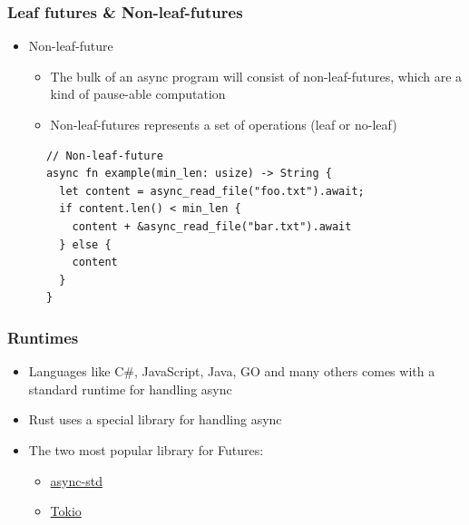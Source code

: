\begin{frame}[fragile]
    \frametitle{Leaf futures \& Non-leaf-futures}
    \begin{itemize}

        \item Non-leaf-future
        \begin{itemize}
            \item The bulk of an async program will consist of non-leaf-futures, which are a kind of pause-able computation
            \item Non-leaf-futures represents a set of operations (leaf or no-leaf)
        \end{itemize}
    \end{itemize}
    \begin{block}{}
        \begin{verbatim}
      // Non-leaf-future
      async fn example(min_len: usize) -> String {
        let content = async_read_file("foo.txt").await;
        if content.len() < min_len {
          content + &async_read_file("bar.txt").await
        } else {
          content
        }
      }
        \end{verbatim}
    \end{block}
\end{frame}
\begin{frame}[fragile]
    \frametitle{Runtimes}
    \begin{itemize}
        \item Languages like C\#, JavaScript, Java, GO and many others comes with a standard runtime for handling async
        \item Rust uses a special library for handling async

        \item The two most popular library for Futures:
    	\begin{itemize}
    	    \item \href{https://github.com/async-rs/async-std}{async-std}
    	    \item \href{https://github.com/tokio-rs/tokio}{Tokio}
    	\end{itemize}
    \end{itemize}
% 
\end{frame}


